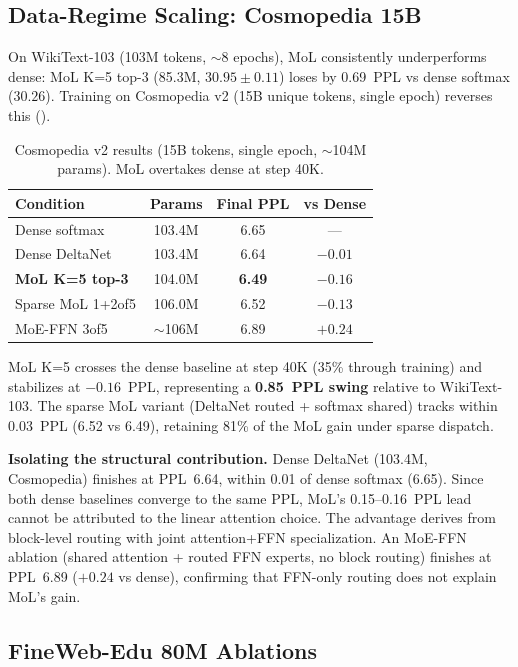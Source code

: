 \documentclass[10pt]{article}
\newcommand{\Paragraph}[1]{\vspace{0.5em}\noindent\textbf{#1}}
\begin{document}
\subsection{Data-Regime Scaling: Cosmopedia 15B}
\label{sec:scaling}

On WikiText-103 (103M tokens, ${\sim}$8 epochs), MoL consistently underperforms dense: MoL K=5 top-3 (85.3M, $30.95 \pm 0.11$) loses by 0.69~PPL vs dense softmax ($30.26$).
Training on Cosmopedia v2 (15B unique tokens, single epoch) reverses this ().

\begin{table}[t]
\centering
\caption{Cosmopedia v2 results (15B tokens, single epoch, ${\sim}$104M params). MoL overtakes dense at step 40K.}
\label{tab:cosmopedia}
\small
\begin{tabular}{lccc}
\toprule
Condition & Params & Final PPL & vs Dense \\
\midrule
Dense softmax & 103.4M & 6.65 & --- \\
Dense DeltaNet & 103.4M & 6.64 & $-0.01$ \\
\textbf{MoL K=5 top-3} & 104.0M & \textbf{6.49} & $\mathbf{-0.16}$ \\
Sparse MoL 1+2of5 & 106.0M & 6.52 & $-0.13$ \\
MoE-FFN 3of5 & ${\sim}$106M & 6.89 & $+0.24$ \\
\bottomrule
\end{tabular}
\end{table}

MoL K=5 crosses the dense baseline at step 40K (35\% through training) and stabilizes at $-0.16$~PPL, representing a \textbf{0.85~PPL swing} relative to WikiText-103.
The sparse MoL variant (DeltaNet routed + softmax shared) tracks within 0.03~PPL (6.52 vs 6.49), retaining 81\% of the MoL gain under sparse dispatch.

\Paragraph{Isolating the structural contribution.}
Dense DeltaNet (103.4M, Cosmopedia) finishes at PPL~6.64, within 0.01 of dense softmax (6.65).
Since both dense baselines converge to the same PPL, MoL's 0.15--0.16~PPL lead cannot be attributed to the linear attention choice.
The advantage derives from block-level routing with joint attention+FFN specialization.
An MoE-FFN ablation (shared attention + routed FFN experts, no block routing) finishes at PPL~6.89 ($+0.24$ vs dense), confirming that FFN-only routing does not explain MoL's gain.

\subsection{FineWeb-Edu 80M Ablations}
\label{sec:fineweb_80m}
\end{document}
